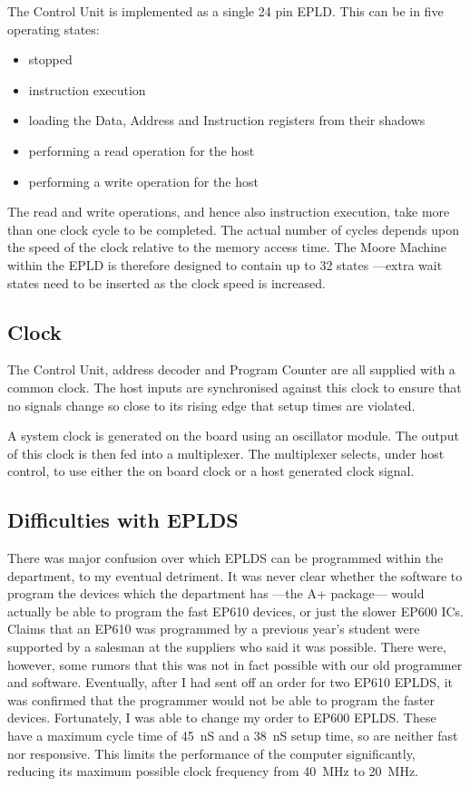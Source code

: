 The Control Unit is implemented as a single 24 pin EPLD. This can be in five operating states:
\begin{itemize}
\item
	stopped
\item
	instruction execution
\item
loading the Data, Address and  Instruction registers from their 
shadows
\item
	performing a read operation for the host
\item
	performing a write operation for the host
\end{itemize}
The read and write operations, and hence also instruction  
execution,  take more than one clock cycle to be completed.
 The actual number of cycles depends upon
the speed of the clock relative to the memory access time.
The Moore Machine within the EPLD  is therefore  designed to contain up to 32 states ---extra wait states  need to be inserted as the clock speed is increased.

 
\subsection{Clock}

The Control Unit, address decoder and Program Counter are all supplied with a common clock. 
The host inputs are  synchronised against this clock to ensure that no signals change so close to its rising edge that  setup times are violated.

A system clock is generated on the board using an
oscillator module. 
The output of this clock is then fed into a multiplexer. The 
multiplexer  selects, under  host control, to use either the on 
board clock or a host generated clock signal. 

\subsection{Difficulties with EPLDS}

There was major confusion over which EPLDS can be 
programmed within the department, to my eventual detriment. It was never clear whether the software to program the devices which 
the department has ---the A+ package---  would actually be able to 
program the fast EP610 devices, or just the slower EP600 ICs. 
Claims that an EP610  was programmed by a previous year's 
student were supported by a salesman at the suppliers who said it was possible.
There were, however, some  rumors that this was not in fact possible with our old
programmer and software.
 Eventually, after I had sent off an order for two  EP610 EPLDS, it was confirmed that the programmer 
would not be able to program the faster devices. 
Fortunately, I was able to change 
my order to EP600 EPLDS. 
These have a maximum cycle time of 45~nS and  a 38~nS setup time, so are neither fast nor  responsive.
This  limits the performance of the computer significantly,
reducing its  maximum possible clock frequency from 40~MHz to 20~MHz.






